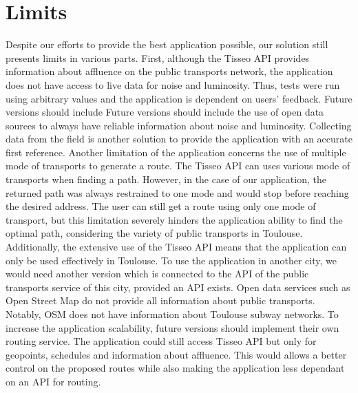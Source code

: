\section{Limits}

Despite our efforts to provide the best application possible, our solution still presents limits in various parts.
\newline
First, although the Tisseo API provides information about affluence on the public transports network, the application does not have access to live data for noise and luminosity. Thus, tests were run using arbitrary values and the application is dependent on users’ feedback. Future versions should include Future versions should include the use of open data sources to always have reliable information about noise and luminosity. Collecting data from the field is another solution to provide the application with an accurate first reference.
\newline
Another limitation of the application concerns the use of multiple mode of transports to generate a route. The Tisseo API can uses various mode of transports when finding a path. However, in the case of our application, the returned path was always restrained to one mode and would stop before reaching the desired address. The user can still get a route using only one mode of transport, but this limitation severely hinders the application ability to find the optimal path, considering the variety of public transports in Toulouse.
\newline
Additionally, the extensive use of the Tisseo API means that the application can only be used effectively in Toulouse. To use the application in another city, we would need another version which is connected to the API of the public transports service of this city, provided an API exists. Open data services such as Open Street Map do not provide all information about public transports. Notably, OSM does not have information about Toulouse subway networks.
\newline
To increase the application scalability, future versions should implement their own routing service. The application could still access Tisseo API but only for geopoints, schedules and information about affluence. This would allows a better control on the proposed routes while also making the application less dependant on an API for routing.
